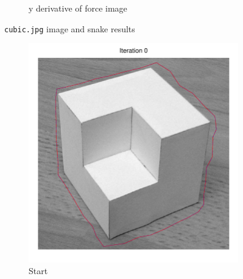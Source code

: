 \documentclass[11pt,a4paper]{article}
\begin{document}
\begin{figure}[H]
\begin{subfigure}[t]{0.48\textwidth}
        \caption{y derivative of force image}
        \label{fig:cubic_fy}
    \end{subfigure}
    \caption{\texttt{cubic.jpg} image and snake results}
    \label{fig:cubic}
\end{figure}

\begin{figure}[H]
    \centering
    \begin{subfigure}[t]{0.48\textwidth}
        \includegraphics[width=\textwidth]{src/images/cubic_0.pdf}
        \caption{Start}
        \label{fig:cubic_grayscale}
    \end{subfigure}
    \begin{subfigure}[t]{0.48\textwidth}

\end{subfigure}
\end{figure}
\end{document}
